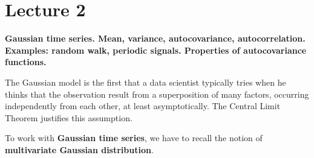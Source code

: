 \section{Lecture 2}
\label{lecture2}

\begin{center}
    \textbf{Gaussian time series. Mean, variance, autocovariance, autocorrelation. Examples: random walk, periodic signals. Properties of autocovariance functions.}
\end{center}

The Gaussian model is the first that a data scientist typically tries when he thinks that the observation result from a superposition of many factors, occurring independently from each other, at least asymptotically. The Central Limit Theorem justifies this assumption.

To work with \textbf{Gaussian time series}, we have to recall the notion of \textbf{multivariate Gaussian distribution}.
